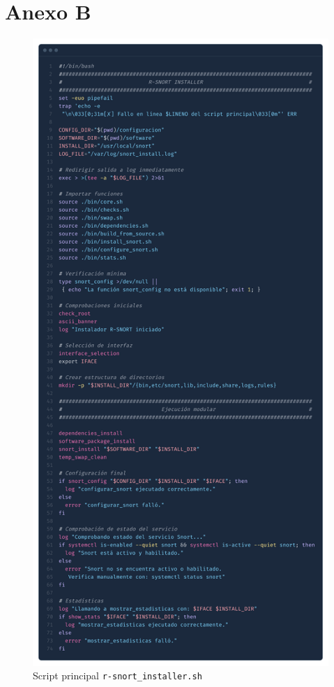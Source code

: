 \documentclass[12pt,a4paper]{report}
\begin{document}
\chapter{Anexo B}

\begin{figure}[H]
	\centering
	\includegraphics[scale=0.08]{script_automatico/1.png}
	\caption{Script principal \texttt{r-snort\_installer.sh}}
	\label{fig:r-snort_installer}
\end{figure}
\end{document}
